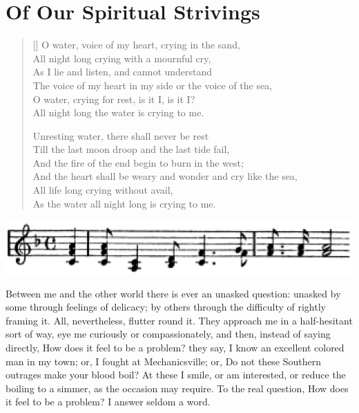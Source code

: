 
\author{W. E. B. Du Bois}
\chapter{Of Our Spiritual Strivings}


\settowidth{}
\begin{verse}[\versewidth]
O water, voice of my heart, crying in the sand,\\
\vin All night long crying with a mournful cry,\\
As I lie and listen, and cannot understand\\
\vin\vin The voice of my heart in my side or the voice of the sea,\\
\vin O water, crying for rest, is it I, is it I?\\
\vin\vin All night long the water is crying to me.

Unresting water, there shall never be rest\\
\vin Till the last moon droop and the last tide fail,\\
And the fire of the end begin to burn in the west;\\
\vin\vin And the heart shall be weary and wonder and cry like the sea,\\
\vin All life long crying without avail,\\
\vin\vin As the water all night long is crying to me.\\
\end{verse}

\begin{center}
\includegraphics[width=\maxwidth]{texts/music.eps}
\end{center}

\noindent Between me and the other world there is ever an unasked
question: unasked by some through feelings of delicacy; by others
through the difficulty of rightly framing it. All, nevertheless,
flutter round it. They approach me in a half-hesitant sort of way, eye
me curiously or compassionately, and then, instead of saying directly,
How does it feel to be a problem? they say, I know an excellent
 colored man in my town; or, I fought at Mechanicsville; or,
Do not these Southern outrages make your blood boil? At these I smile,
or am interested, or reduce the boiling to a simmer, as the occasion
may require. To the real question, How does it feel to be a problem? I
answer seldom a word.

